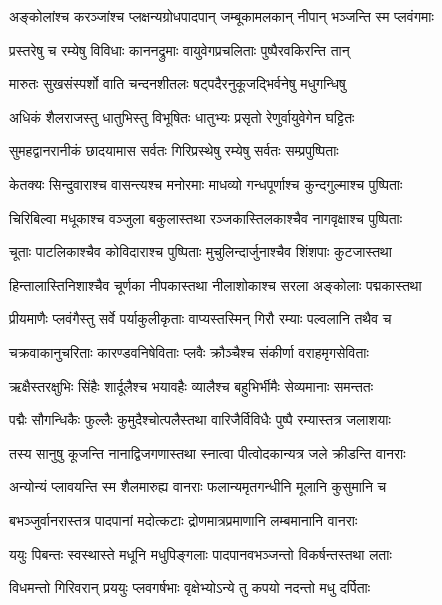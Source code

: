 \twolineshloka
{अङ्कोलांश्च करञ्जांश्च प्लक्षन्यग्रोधपादपान्}
{जम्बूकामलकान् नीपान् भञ्जन्ति स्म प्लवंगमाः} %

\twolineshloka
{प्रस्तरेषु च रम्येषु विविधाः काननद्रुमाः}
{वायुवेगप्रचलिताः पुष्पैरवकिरन्ति तान्} %

\twolineshloka
{मारुतः सुखसंस्पर्शो वाति चन्दनशीतलः}
{षट्पदैरनुकूजद्भिर्वनेषु मधुगन्धिषु} %

\twolineshloka
{अधिकं शैलराजस्तु धातुभिस्तु विभूषितः}
{धातुभ्यः प्रसृतो रेणुर्वायुवेगेन घट्टितः} %

\twolineshloka
{सुमहद्वानरानीकं छादयामास सर्वतः}
{गिरिप्रस्थेषु रम्येषु सर्वतः सम्प्रपुष्पिताः} %

\twolineshloka
{केतक्यः सिन्दुवाराश्च वासन्त्यश्च मनोरमाः}
{माधव्यो गन्धपूर्णाश्च कुन्दगुल्माश्च पुष्पिताः} %

\twolineshloka
{चिरिबिल्वा मधूकाश्च वञ्जुला बकुलास्तथा}
{रञ्जकास्तिलकाश्चैव नागवृक्षाश्च पुष्पिताः} %

\twolineshloka
{चूताः पाटलिकाश्चैव कोविदाराश्च पुष्पिताः}
{मुचुलिन्दार्जुनाश्चैव शिंशपाः कुटजास्तथा} %

\twolineshloka
{हिन्तालास्तिनिशाश्चैव चूर्णका नीपकास्तथा}
{नीलाशोकाश्च सरला अङ्कोलाः पद्मकास्तथा} %

\twolineshloka
{प्रीयमाणैः प्लवंगैस्तु सर्वे पर्याकुलीकृताः}
{वाप्यस्तस्मिन् गिरौ रम्याः पल्वलानि तथैव च} %

\twolineshloka
{चक्रवाकानुचरिताः कारण्डवनिषेविताः}
{प्लवैः क्रौञ्चैश्च संकीर्णा वराहमृगसेविताः} %

\twolineshloka
{ऋक्षैस्तरक्षुभिः सिंहैः शार्दूलैश्च भयावहैः}
{व्यालैश्च बहुभिर्भीमैः सेव्यमानाः समन्ततः} %

\twolineshloka
{पद्मैः सौगन्धिकैः फुल्लैः कुमुदैश्चोत्पलैस्तथा}
{वारिजैर्विविधैः पुष्पै रम्यास्तत्र जलाशयाः} %

\twolineshloka
{तस्य सानुषु कूजन्ति नानाद्विजगणास्तथा}
{स्नात्वा पीत्वोदकान्यत्र जले क्रीडन्ति वानराः} %

\twolineshloka
{अन्योन्यं प्लावयन्ति स्म शैलमारुह्य वानराः}
{फलान्यमृतगन्धीनि मूलानि कुसुमानि च} %

\twolineshloka
{बभञ्जुर्वानरास्तत्र पादपानां मदोत्कटाः}
{द्रोणमात्रप्रमाणानि लम्बमानानि वानराः} %

\twolineshloka
{ययुः पिबन्तः स्वस्थास्ते मधूनि मधुपिङ्गलाः}
{पादपानवभञ्जन्तो विकर्षन्तस्तथा लताः} %

\twolineshloka
{विधमन्तो गिरिवरान् प्रययुः प्लवगर्षभाः}
{वृक्षेभ्योऽन्ये तु कपयो नदन्तो मधु दर्पिताः} %

